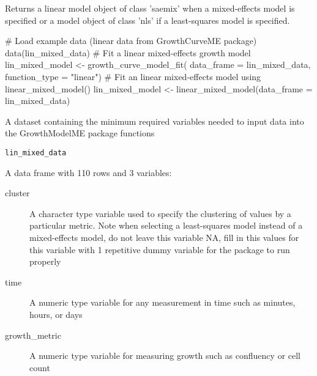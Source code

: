 \documentclass[a4paper]{book}
\begin{document}
%
\begin{Value}
Returns a linear model object of class 'saemix' when a mixed-effects
model is specified or a model object of class 'nls' if a least-squares
model is specified.
\end{Value}
%
\begin{SeeAlso}
\end{SeeAlso}
%
\begin{Examples}
\begin{ExampleCode}
# Load example data (linear data from GrowthCurveME package)
data(lin_mixed_data)
# Fit a linear mixed-effects growth model
lin_mixed_model <- growth_curve_model_fit(
data_frame = lin_mixed_data,
function_type = "linear")
# Fit an linear mixed-effects model using linear_mixed_model()
lin_mixed_model <- linear_mixed_model(data_frame = lin_mixed_data)
\end{ExampleCode}
\end{Examples}
%
\begin{Description}
A dataset containing the minimum required variables needed to input data
into the GrowthModelME package functions
\end{Description}
%
\begin{Usage}
\begin{verbatim}
lin_mixed_data
\end{verbatim}
\end{Usage}
%
\begin{Format}
A data frame with 110 rows and 3 variables:
\begin{description}

\item[cluster] A character type variable used to specify the clustering
of values by a particular metric. Note when selecting a least-squares
model instead of a mixed-effects model, do not leave this variable NA,
fill in this values for this variable with 1 repetitive dummy variable for
the package to run properly
\item[time] A numeric type variable for any measurement in time such as
minutes, hours, or days
\item[growth\_metric] A numeric type variable for measuring growth such as
confluency or cell count

\end{description}

\end{Format}
\end{document}
